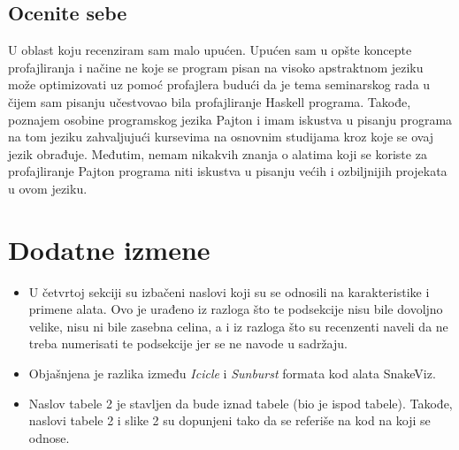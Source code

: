 \documentclass[a4paper]{report}
\begin{document}
\section{Ocenite sebe}
U oblast koju recenziram sam malo upućen. Upućen sam u opšte koncepte profajliranja i načine ne koje se program pisan na visoko apstraktnom jeziku može optimizovati uz pomoć profajlera budući da je tema seminarskog rada u čijem sam pisanju učestvovao bila profajliranje Haskell programa. Takođe, poznajem osobine programskog jezika Pajton i imam iskustva u pisanju programa na tom jeziku zahvaljujući kursevima na osnovnim studijama kroz koje se ovaj jezik obrađuje. Međutim, nemam nikakvih znanja o alatima koji se koriste za profajliranje Pajton programa niti iskustva u pisanju većih i ozbiljnijih projekata u ovom jeziku.



\chapter{Dodatne izmene}
\begin{itemize}
    
\item U četvrtoj sekciji su izbačeni naslovi koji su se odnosili na karakteristike i primene alata. Ovo je urađeno iz razloga što te podsekcije nisu bile dovoljno velike, nisu ni bile zasebna celina, a i iz razloga što su recenzenti naveli da ne treba numerisati te podsekcije jer se ne navode u sadržaju.

\item Objašnjena je razlika između {\em Icicle} i {\em Sunburst} formata kod alata SnakeViz.

\item Naslov tabele 2 je stavljen da bude iznad tabele (bio je ispod tabele). Takođe, naslovi tabele 2 i slike 2 su dopunjeni tako da se referiše na kod na koji se odnose.

\end{itemize}
\end{document}
